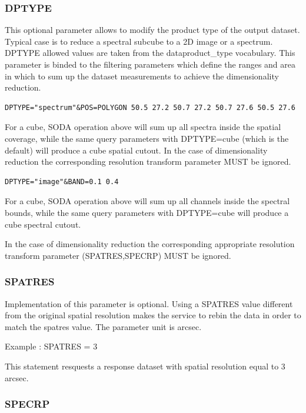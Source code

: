 \documentclass[11pt,a4paper]{ivoa}
\begin{document}
\subsubsection{DPTYPE}
\label{sec:DPTYPE}
This optional  parameter allows to modify the product type of the output dataset. Typical case is to reduce a spectral subcube to a 2D image or a spectrum. DPTYPE allowed values are taken from the dataproduct\_type vocabulary. This parameter is binded to the filtering parameters which define the ranges and area in which to sum up the dataset measurements to achieve the dimensionality reduction. 
\begin{lstlisting}
DPTYPE="spectrum"&POS=POLYGON 50.5 27.2 50.7 27.2 50.7 27.6 50.5 27.6
\end{lstlisting}

For a cube, SODA operation above  will sum up all spectra inside the spatial coverage, while the same query parameters with DPTYPE=cube (which is the default) will produce a cube spatial cutout. In the case of dimensionality reduction the corresponding resolution transform parameter MUST be ignored.

\begin{lstlisting}
DPTYPE="image"&BAND=0.1 0.4
\end{lstlisting}
For a cube, SODA operation above will sum up all channels inside the spectral bounds, while the same query parameters with DPTYPE=cube will produce a cube spectral cutout.  

In the case of dimensionality reduction the corresponding appropriate resolution transform parameter (SPATRES,SPECRP) MUST be ignored.

\subsubsection{SPATRES}


Implementation of this parameter is optional. Using a SPATRES value different from the original spatial resolution makes the service to rebin the data in order to match the spatres value. The parameter unit is arcsec.  

Example : SPATRES = 3  

This statement resquests a response dataset with spatial resolution equal to 3 arcsec.

\subsubsection{SPECRP}
\end{document}
